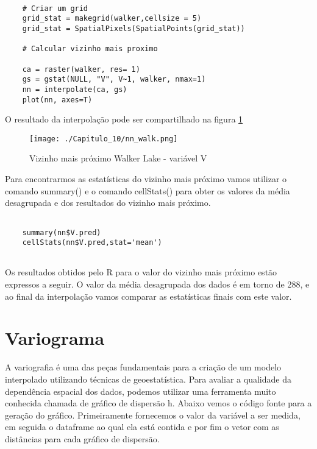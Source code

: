 \begin{scriptsize}
	\estiloR
	\begin{lstlisting}[]
		
	# Criar um grid 
	grid_stat = makegrid(walker,cellsize = 5)
	grid_stat = SpatialPixels(SpatialPoints(grid_stat))
	
	# Calcular vizinho mais proximo
	
	ca = raster(walker, res= 1)
	gs = gstat(NULL, "V", V~1, walker, nmax=1)
	nn = interpolate(ca, gs)
	plot(nn, axes=T)
	\end{lstlisting}
\end{scriptsize}

O resultado da interpolação pode ser compartilhado na figura \ref{vizinho_m_prox} 

\FloatBarrier
\begin{figure}[H]
	\centering
	\texttt{[image: ./Capitulo\_10/nn\_walk.png]}	
	\caption{Vizinho mais próximo Walker Lake - variável V}
	\label{vizinho_m_prox}
\end{figure}
\FloatBarrier

Para encontrarmos as estatísticas do vizinho mais próximo vamos utilizar o comando summary() e o comando cellStats() para obter os valores da média desagrupada e dos resultados do vizinho mais próximo.  

\begin{scriptsize}
	\estiloR
	\begin{lstlisting}[]
	
	summary(nn$V.pred)
	cellStats(nn$V.pred,stat='mean')
	
	\end{lstlisting}
\end{scriptsize}

Os resultados obtidos pelo R para o valor do vizinho mais próximo estão expressos a seguir. O valor da média desagrupada dos dados é em torno de 288, e ao final da interpolação vamos comparar as estatísticas finais com este valor.

\begingroup
{}

\endgroup

\section{Variograma} 

A variografia é uma das peças fundamentais para a criação de um modelo interpolado utilizando técnicas de geoestatística. Para avaliar a qualidade da dependência espacial dos dados, podemos utilizar uma ferramenta muito conhecida chamada de gráfico de dispersão h. Abaixo vemos o código fonte para a geração do gráfico. Primeiramente fornecemos o valor da variável a ser medida, em seguida o dataframe ao qual ela está contida e por fim o vetor com as distâncias para cada gráfico de dispersão.

